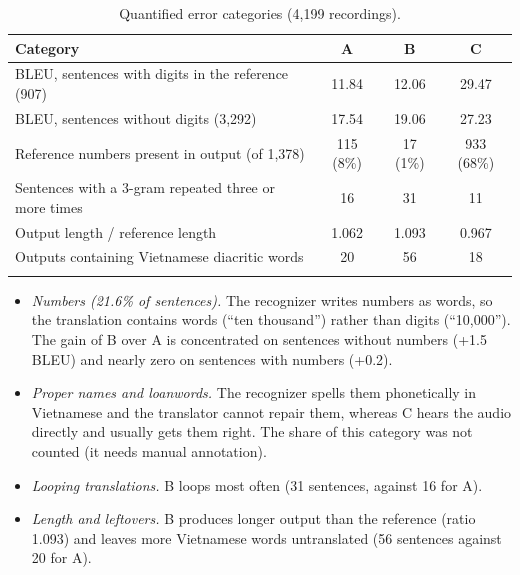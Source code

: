 \documentclass[pdflatex,sn-mathphys-num]{sn-jnl}
\begin{document}
\begin{table}[t]
\caption{Quantified error categories (4,199 recordings).}\label{tab:errors}
\begin{tabular}{@{}lccc@{}}
\toprule
Category & A & B & C\\
\midrule
BLEU, sentences with digits in the reference (907) & 11.84 & 12.06 & 29.47\\
BLEU, sentences without digits (3,292) & 17.54 & 19.06 & 27.23\\
Reference numbers present in output (of 1,378) & 115 (8\%) & 17 (1\%) & 933 (68\%)\\
Sentences with a 3-gram repeated three or more times & 16 & 31 & 11\\
Output length / reference length & 1.062 & 1.093 & 0.967\\
Outputs containing Vietnamese diacritic words & 20 & 56 & 18\\
\botrule
\end{tabular}
\end{table}

\begin{itemize}
\item \emph{Numbers (21.6\% of sentences).} The recognizer writes numbers as words, so the translation contains words (``ten thousand'') rather than digits (``10,000''). The gain of B over A is concentrated on sentences without numbers (+1.5 BLEU) and nearly zero on sentences with numbers (+0.2).
\item \emph{Proper names and loanwords.} The recognizer spells them phonetically in Vietnamese and the translator cannot repair them, whereas C hears the audio directly and usually gets them right. The share of this category was not counted (it needs manual annotation).
\item \emph{Looping translations.} B loops most often (31 sentences, against 16 for A).
\item \emph{Length and leftovers.} B produces longer output than the reference (ratio 1.093) and leaves more Vietnamese words untranslated (56 sentences against 20 for A).
\end{itemize}
\end{document}
